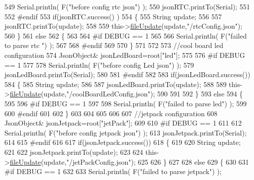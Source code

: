 \begin{DoxyCode}
549     Serial.println( F(\textcolor{stringliteral}{"before config rtc json"}) );
550     jsonRTC.printTo(Serial);
551 
552 \textcolor{preprocessor}{#endif}
553     \textcolor{keywordflow}{if}(jsonRTC.success() )
554     \{
555         String update;
556 
557         jsonRTC.printTo(update);
558 
559         this->\hyperlink{class_cool_file_system_a13f2958f5b87757c31fc53797a30d23a}{fileUpdate}(update,\textcolor{stringliteral}{"/rtcConfig.json"});           
560     \}
561     \textcolor{keywordflow}{else}
562     \{
563     
564 \textcolor{preprocessor}{    #if DEBUG == 1 }
565 
566         Serial.println( F(\textcolor{stringliteral}{"failed to parse rtc "}) );
567     
568 \textcolor{preprocessor}{    #endif}
569 
570     \}
571     
572     
573         \textcolor{comment}{//cool board led configuration}
574         JsonObject& jsonLedBoard=root[\textcolor{stringliteral}{"led"}];
575     
576 \textcolor{preprocessor}{#if DEBUG == 1 }
577 
578     Serial.println( F(\textcolor{stringliteral}{"before config Led json"}) );
579     jsonLedBoard.printTo(Serial);
580 
581 \textcolor{preprocessor}{#endif}
582 
583     \textcolor{keywordflow}{if}(jsonLedBoard.success())
584     \{   
585         String update;
586     
587         jsonLedBoard.printTo(update);
588 
589         this->\hyperlink{class_cool_file_system_a13f2958f5b87757c31fc53797a30d23a}{fileUpdate}(update,\textcolor{stringliteral}{"/coolBoardLedConfig.json"});      
590 
591     
592     \}
593     \textcolor{keywordflow}{else}
594     \{
595     
596 \textcolor{preprocessor}{    #if DEBUG == 1 }
597 
598         Serial.println( F(\textcolor{stringliteral}{"failed to parse led"}) );
599     
600 \textcolor{preprocessor}{    #endif }
601 
602     \}
603         
604 
605     
606 
607     \textcolor{comment}{//jetpack configuration}
608         JsonObject& jsonJetpack=root[\textcolor{stringliteral}{"jetPack"}];
609 
610 \textcolor{preprocessor}{#if DEBUG == 1 }
611 
612     Serial.println( F(\textcolor{stringliteral}{"before config jetpack json"}) );
613     jsonJetpack.printTo(Serial);
614 
615 \textcolor{preprocessor}{#endif}
616 
617     \textcolor{keywordflow}{if}(jsonJetpack.success())
618     \{
619     
620         String update;
621     
622         jsonJetpack.printTo(update);
623 
624         this->\hyperlink{class_cool_file_system_a13f2958f5b87757c31fc53797a30d23a}{fileUpdate}(update,\textcolor{stringliteral}{"/jetPackConfig.json"});       
625 
626     \}
627 
628     \textcolor{keywordflow}{else}
629     \{
630     
631 \textcolor{preprocessor}{    #if DEBUG == 1 }
632 
633         Serial.println( F(\textcolor{stringliteral}{"failed to parse jetpack"}) ); 

\end{DoxyCode}
